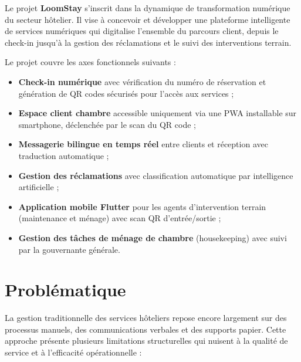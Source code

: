 Le projet \textbf{LoomStay} s'inscrit dans la dynamique de transformation numérique du secteur hôtelier. Il vise à concevoir et développer une plateforme intelligente de services numériques qui digitalise l'ensemble du parcours client, depuis le check-in jusqu'à la gestion des réclamations et le suivi des interventions terrain.

Le projet couvre les axes fonctionnels suivants :
\begin{itemize}
  \item \textbf{Check-in numérique} avec vérification du numéro de réservation et génération de QR codes sécurisés pour l'accès aux services ;
  \item \textbf{Espace client chambre} accessible uniquement via une PWA installable sur smartphone, déclenchée par le scan du QR code ;
  \item \textbf{Messagerie bilingue en temps réel} entre clients et réception avec traduction automatique ;
  \item \textbf{Gestion des réclamations} avec classification automatique par intelligence artificielle ;
  \item \textbf{Application mobile Flutter} pour les agents d'intervention terrain (maintenance et ménage) avec scan QR d'entrée/sortie ;
  \item \textbf{Gestion des tâches de ménage de chambre} (housekeeping) avec suivi par la gouvernante générale.
\end{itemize}

\section{Problématique}
\label{sec:problematique}

La gestion traditionnelle des services hôteliers repose encore largement sur des processus manuels, des communications verbales et des supports papier. Cette approche présente plusieurs limitations structurelles qui nuisent à la qualité de service et à l'efficacité opérationnelle :

